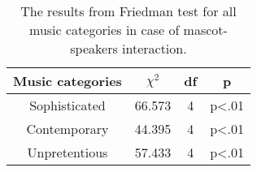 \begin{table}[!htb]
    \renewcommand{\arraystretch}{1}
    \begin{center}
        \begin{tabular}{|c|c|c|c|}
            \hline
            \textbf{Music categories} & \textbf{$\chi^2$} & \textbf{df} & \textbf{p} \\
            \hline
            Sophisticated &66.573 &4 &p<.01 \\
            \hline
            Contemporary &44.395 &4 &p<.01\\
            \hline
            Unpretentious &57.433 &4 &p<.01 \\
            \hline
        \end{tabular}
        \caption{The results from Friedman test for all music categories in case of mascot-speakers interaction.}
        \label{table:friedmanMS2}
    \end{center}
\end{table}

